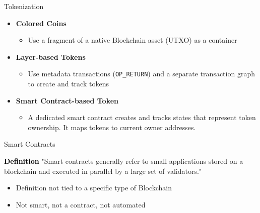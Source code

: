 \documentclass[]{beamer}
\begin{document}
\begin{frame}{Tokenization}	
	\begin{itemize}
		\item<1 ->\textbf{Colored Coins}
		\begin{itemize}
			\item<1 ->Use a fragment of a native Blockchain asset (UTXO) as a container
		\end{itemize}
		\vspace{1em}
		\item<2 ->\textbf{Layer-based Tokens}
		\begin{itemize}
			\item<2 -> Use metadata transactions (\texttt{OP\_RETURN}) and a separate transaction graph to create and track tokens
		\end{itemize}
		\vspace{1em}
		\item<3 ->\textbf{Smart Contract-based Token}
		\begin{itemize}
			\item<3 -> A dedicated smart contract creates and tracks states that represent token ownership. It maps tokens to current owner addresses.
		\end{itemize}
	\end{itemize}
\end{frame}


\begin{frame}{Smart Contracts}
	\begin{block}{\textbf{\textcolor{black}{Definition}}}
		"Smart contracts generally refer to small applications stored on a blockchain and executed in parallel by a large
		set of validators."\cite{schar2021defi}
	\end{block}
	\begin{itemize}
		\item<2-> Definition not tied to a specific type of Blockchain
		\item<3-> Not smart, not a contract, not automated
	\end{itemize}
\end{frame}

\end{document}
